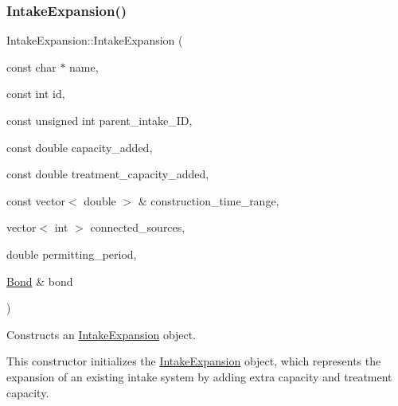 \subsubsection{\texorpdfstring{Intake\+Expansion()}{IntakeExpansion()}\hspace{0.1cm}{\footnotesize\ttfamily [1/2]}}
{\footnotesize\ttfamily Intake\+Expansion\+::\+Intake\+Expansion (\begin{DoxyParamCaption}\item[{const char $\ast$}]{name,  }\item[{const int}]{id,  }\item[{const unsigned int}]{parent\+\_\+intake\+\_\+\+ID,  }\item[{const double}]{capacity\+\_\+added,  }\item[{const double}]{treatment\+\_\+capacity\+\_\+added,  }\item[{const vector$<$ double $>$ \&}]{construction\+\_\+time\+\_\+range,  }\item[{vector$<$ int $>$}]{connected\+\_\+sources,  }\item[{double}]{permitting\+\_\+period,  }\item[{\mbox{\hyperlink{classBond}{Bond}} \&}]{bond }\end{DoxyParamCaption})}



Constructs an \mbox{\hyperlink{classIntakeExpansion}{Intake\+Expansion}} object. 

This constructor initializes the \mbox{\hyperlink{classIntakeExpansion}{Intake\+Expansion}} object, which represents the expansion of an existing intake system by adding extra capacity and treatment capacity.


